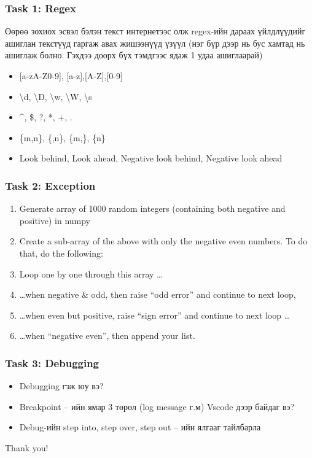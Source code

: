 \documentclass{beamer}
\begin{document}
\begin{frame}
    \frametitle{Task 1: Regex}
    Өөрөө зохиох эсвэл бэлэн текст интернетээс олж regex-ийн 
    дараах үйлдлүүдийг ашиглан текстүүд гаргаж авах жишээнүүд үзүүл 
    (нэг бүр дээр нь бус хамтад нь ашиглаж болно. Гэхдээ доорх бүх тэмдгээс ядаж 1 удаа ашиглаарай)

    \begin{itemize}
        \item {[a-zA-Z0-9], [a-z],[A-Z],[0-9]}
        \item \textbackslash d, \textbackslash D, \textbackslash w, \textbackslash W, \textbackslash s
        \item \^{}, \$, ?, *, +, .
        \item \{m,n\}, \{,n\}, \{m,\}, \{n\}
        \item Look behind, Look ahead, Negative look behind, Negative look ahead
    \end{itemize}
\end{frame}

\begin{frame}
    \frametitle{Task 2: Exception}
    \begin{enumerate}
        \item Generate array of 1000 random integers (containing both negative and positive) in numpy 
        \item Create a sub-array of the above with only the negative even numbers. To do that, do the following:
        \item Loop one by one through this array …
        \item \ldots when negative & odd, then raise “odd error” and continue to next loop, 
        \item \ldots when even but positive, raise “sign error” and continue to next loop \ldots
        \item \ldots when “negative even”, then append your list. 
    \end{enumerate}
\end{frame}

\begin{frame}
    \frametitle{Task 3: Debugging}
    \begin{itemize}
        \item Debugging гэж юу вэ?
        \item Breakpoint – ийн ямар 3 төрөл (log message г.м) Vscode дээр байдаг вэ?
        \item Debug-ийн step into, step over, step out – ийн ялгааг тайлбарла 
    \end{itemize}
\end{frame}



\begin{frame}
\Huge{\centerline{Thank you!}}
\end{frame}

\end{document}
